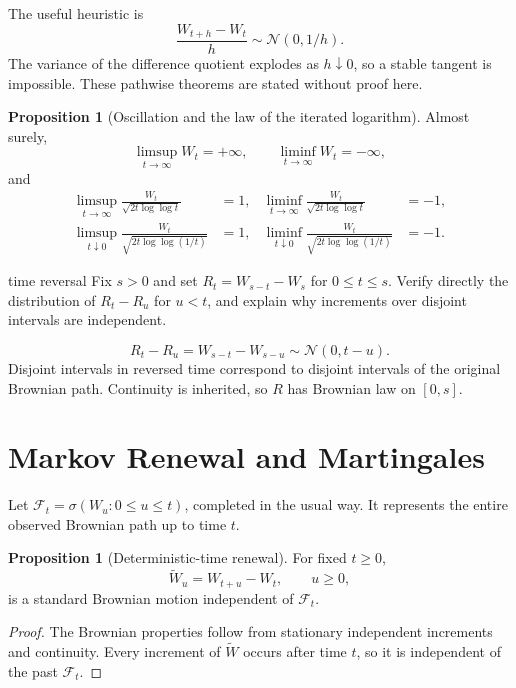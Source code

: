 \documentclass[10pt]{article}
\newcommand{\1}{\mathbf 1}
\newcommand{\cF}{\mathcal F}
\theoremstyle{definition}
\newtheorem{proposition}[definition]{Proposition}
\begin{document}
The useful heuristic is
\[
\frac{W_{t+h}-W_t}{h}\sim\mathcal N(0,1/h).
\]
The variance of the difference quotient explodes as \(h\downarrow0\), so a
stable tangent is impossible. These pathwise theorems are stated without
proof here.

\begin{proposition}[Oscillation and the law of the iterated logarithm]
Almost surely,
\[
\limsup_{t\to\infty}W_t=+\infty,
\qquad
\liminf_{t\to\infty}W_t=-\infty,
\]
and
\[
\begin{aligned}
\limsup_{t\to\infty}\frac{W_t}{\sqrt{2t\log\log t}}&=1,
&\liminf_{t\to\infty}\frac{W_t}{\sqrt{2t\log\log t}}&=-1,\\
\limsup_{t\downarrow0}\frac{W_t}{\sqrt{2t\log\log(1/t)}}&=1,
&\liminf_{t\downarrow0}\frac{W_t}{\sqrt{2t\log\log(1/t)}}&=-1.
\end{aligned}
\]
\end{proposition}

\begin{studentexercise}{time reversal}
Fix \(s>0\) and set \(R_t=W_{s-t}-W_s\) for \(0\leq t\leq s\). Verify
directly the distribution of \(R_t-R_u\) for \(u<t\), and explain why
increments over disjoint intervals are independent.
\end{studentexercise}
\begin{shortsolution}
\[
R_t-R_u=W_{s-t}-W_{s-u}\sim\mathcal N(0,t-u).
\]
Disjoint intervals in reversed time correspond to disjoint intervals of the
original Brownian path. Continuity is inherited, so \(R\) has Brownian law on
\([0,s]\).
\end{shortsolution}

\section{Markov Renewal and Martingales}

Let \(\cF_t=\sigma(W_u:0\leq u\leq t)\), completed in the usual way. It
represents the entire observed Brownian path up to time \(t\).

\begin{proposition}[Deterministic-time renewal]
For fixed \(t\geq0\),
\[
\widetilde W_u=W_{t+u}-W_t,
\qquad u\geq0,
\]
is a standard Brownian motion independent of \(\cF_t\).
\end{proposition}

\begin{proof}
The Brownian properties follow from stationary independent increments and
continuity. Every increment of \(\widetilde W\) occurs after time \(t\), so
it is independent of the past \(\cF_t\).
\end{proof}
\end{document}
